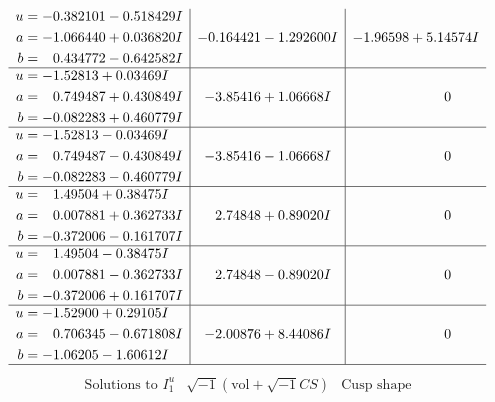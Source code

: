 \documentclass[1p]{elsarticle_modified}
\theoremstyle{definition}
\newcommand{\I}{\sqrt{-1}}
\begin{document}
$$\begin{array}{c|c|c}
\begin{aligned}
u &= -0.382101 - 0.518429 I \\
a &= -1.066440 + 0.036820 I \\
b &= \phantom{-}0.434772 - 0.642582 I\end{aligned}
 & -0.164421 - 1.292600 I & -1.96598 + 5.14574 I \\ \hline\begin{aligned}
u &= -1.52813 + 0.03469 I \\
a &= \phantom{-}0.749487 + 0.430849 I \\
b &= -0.082283 + 0.460779 I\end{aligned}
 & -3.85416 + 1.06668 I & \phantom{-0.000000 } 0 \\ \hline\begin{aligned}
u &= -1.52813 - 0.03469 I \\
a &= \phantom{-}0.749487 - 0.430849 I \\
b &= -0.082283 - 0.460779 I\end{aligned}
 & -3.85416 - 1.06668 I & \phantom{-0.000000 } 0 \\ \hline\begin{aligned}
u &= \phantom{-}1.49504 + 0.38475 I \\
a &= \phantom{-}0.007881 + 0.362733 I \\
b &= -0.372006 - 0.161707 I\end{aligned}
 & \phantom{-}2.74848 + 0.89020 I & \phantom{-0.000000 } 0 \\ \hline\begin{aligned}
u &= \phantom{-}1.49504 - 0.38475 I \\
a &= \phantom{-}0.007881 - 0.362733 I \\
b &= -0.372006 + 0.161707 I\end{aligned}
 & \phantom{-}2.74848 - 0.89020 I & \phantom{-0.000000 } 0 \\ \hline\begin{aligned}
u &= -1.52900 + 0.29105 I \\
a &= \phantom{-}0.706345 - 0.671808 I \\
b &= -1.06205 - 1.60612 I\end{aligned}
 & -2.00876 + 8.44086 I & \phantom{-0.000000 } 0\\
 \hline 
 \end{array}$$\newpage$$\begin{array}{c|c|c}  
\text{Solutions to }I^u_{1}& \I (\text{vol} + \sqrt{-1}CS) & \text{Cusp shape}\\
 \hline 
\begin{aligned}

\end{aligned}
\end{array}$$
\end{document}
